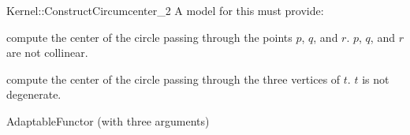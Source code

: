 \begin{ccRefFunctionObjectConcept}{Kernel::ConstructCircumcenter_2}
A model for this must provide:


 {compute the center of the circle passing through the points $p$, $q$, and $r$.
  \ccPrecond $p$, $q$, and $r$ are not collinear.}

 {compute the center of the circle passing through the three vertices of $t$.
  \ccPrecond $t$ is not degenerate.}

\ccRefines
AdaptableFunctor (with three arguments)

\ccSeeAlso
{} \\

\end{ccRefFunctionObjectConcept}

